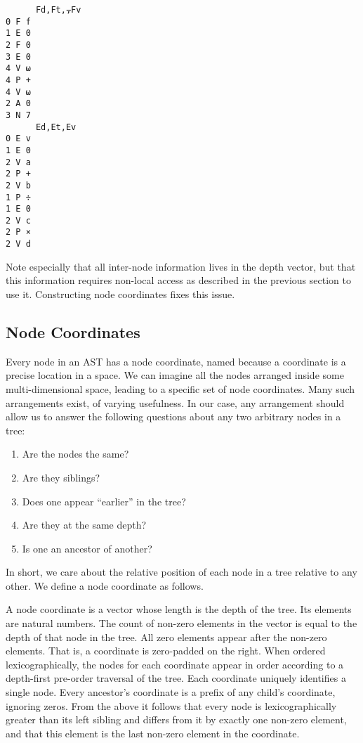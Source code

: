 \documentclass[numbers,preprint]{sigplanconf}
\begin{document}
\begin{verbatim}
      Fd,Ft,⍪Fv
0 F f
1 E 0
2 F 0
3 E 0
4 V ⍵
4 P +
4 V ⍵
2 A 0
3 N 7
      Ed,Et,Ev
0 E v
1 E 0
2 V a
2 P +
2 V b
1 P ÷
1 E 0
2 V c
2 P ×
2 V d
\end{verbatim}

Note especially that all inter-node information lives in the depth vector, but that this information requires 
non-local access as described in the previous section to use it. Constructing node coordinates fixes this issue.
\subsection{Node Coordinates}

Every node in an AST has a node coordinate, named because a coordinate is a precise location in a space. 
We can imagine all the nodes arranged inside some multi-dimensional space, leading to a specific set of 
node coordinates. Many such arrangements exist, of varying usefulness. In our case, any arrangement 
should allow us to answer the following questions about any two arbitrary nodes in a tree:

\begin{enumerate}[noitemsep]
\item Are the nodes the same?
\item Are they siblings?
\item Does one appear “earlier” in the tree?
\item Are they at the same depth?
\item Is one an ancestor of another?
\end{enumerate}

In short, we care about the relative position of each node in a tree relative to any other. We define a node 
coordinate as follows.

A node coordinate is a vector whose length is the depth of the tree. Its elements are natural numbers. 
The count of non-zero elements in the vector is equal to the depth of that node in the tree. All zero elements
appear after the non-zero elements. That is, a coordinate is zero-padded on the right. When ordered 
lexicographically, the nodes for each coordinate appear in order according to a depth-first pre-order 
traversal of the tree. Each coordinate uniquely identifies a single node. Every ancestor’s coordinate is a 
prefix of any child’s coordinate, ignoring zeros. From the above it follows that every node is lexicographically 
greater than its left sibling and differs from it by exactly one non-zero element, and that this element is the 
last non-zero element in the coordinate. 
\end{document}

